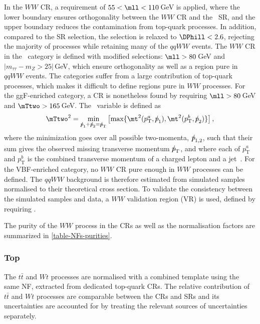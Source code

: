 In the \ZeroJet $WW$ CR, a requirement of $55 < \mll < 110$\,GeV is applied, where the lower boundary ensures orthogonality between the $WW$ CR and the \ZeroJet\ SR, and the upper boundary reduces the contamination from top-quark processes.
In addition, compared to the SR selection, the \DPhill selection is relaxed to $\DPhill < 2.6$, rejecting the majority of \Ztautau processes while retaining many of the $qqWW$ events.
The $WW$ CR in the \OneJet\ category is defined with modified selections: $\mll > 80\,$GeV and $|m_{\tau\tau} - m_Z > 25|\,$GeV, which ensure orthogonality as well as a region pure in $qqWW$ events.
The \TwoJet categories suffer from a large contribution of top-quark processes, which makes it difficult to define regions pure in $WW$ processes.
For the ggF-enriched \TwoJet category, a CR is nonetheless found by requiring $\mll > 80\,$GeV and $\mTtwo > 165\,$GeV. The \mTtwo\ variable is defined as
\begin{equation}
    \mTtwo^2 = \underset{{p\mkern-9.5mu/}_1+{p\mkern-9.5mu/}_2={p\mkern-9.5mu/}_\text{T}}{\textrm{min}} \left[\textrm{max}\{\mt^2(p_\text{T}^a,{p\mkern-9.5mu/}_1),\mt^2(p_\text{T}^b,{p\mkern-9.5mu/}_2)\}\right],
\end{equation}
where the minimization goes over all possible two-momenta, ${p\mkern-9.5mu/}_{1,2}$, such that their sum gives the observed missing transverse momentum ${p\mkern-9.5mu/}_\text{T}$, and where each of $p_\text{T}^a$ and $p_\text{T}^b$ is the combined transverse momentum of a charged lepton and a jet~\cite{PLACEHOLDER:PAPER:CITATION}.
For the VBF-enriched \TwoJet category, no $WW$ CR pure enough in $WW$ processes can be defined. 
The $qqWW$ background is therefore estimated from simulated samples normalised to their theoretical cross section. 
To validate the consistency between the simulated samples and data, a $WW$ validation region (VR) is used, defined by requiring . 


The purity of the $WW$ process in the CRs as well as the normalisation factors are summarized in \cref{table-NFs-purities}.


\subsubsection{Top}
The $t\bar{t}$ and $Wt$ processes are normalised with a combined template using the same NF, extracted from dedicated top-quark CRs.
The relative contribution of $t\bar{t}$ and $Wt$ processes are comparable between the CRs and SRs and its uncertainties are accounted for by treating the relevant sources of uncertainties separately.

